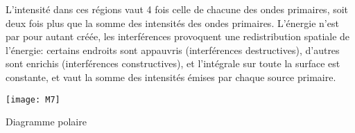
L'intensité dans ces régions vaut 4 fois celle de chacune des ondes primaires, soit deux fois plus que la somme des intensités des ondes primaires. L'énergie n'est par pour autant créée, les interférences provoquent une redistribution spatiale de l'énergie: certains endroits sont appauvris (interférences destructives), d'autres sont enrichis (interférences constructives), et l'intégrale sur toute la surface est constante, et vaut la somme des intensités émises par chaque source primaire.

\begin{marginfigure}[6cm]
	\texttt{[image: M7]}
	\caption{Diagramme polaire}
	\label{fm7}
\end{marginfigure}

